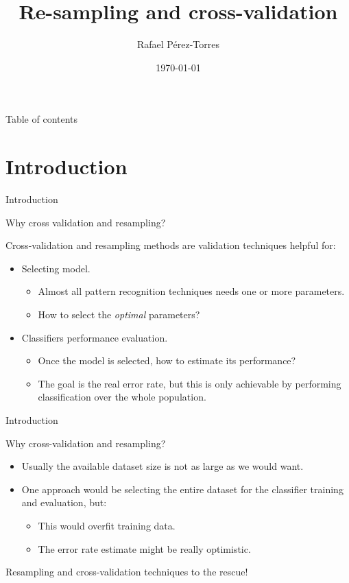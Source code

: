 \documentclass[aspectratio=169,compress,10pt]{beamer}
\author{Rafael Pérez-Torres}
\title{Re-sampling and cross-validation}
\institute{Cinvestav Tamaulipas}
\date{\today}
\begin{document}
\frame{\maketitle}
\begin{frame}{Table of contents}
	\tableofcontents
\end{frame}

\section{Introduction}
\begin{frame}{Introduction}

{\Large{} Why cross validation and resampling?} 

Cross-validation and resampling methods are validation techniques helpful for:
\begin{itemize}
	\item Selecting model.
	\begin{itemize}
		\item Almost all pattern recognition techniques needs one or more parameters.
		\item How to select the \emph{optimal} parameters?
	\end{itemize}
	\item Classifiers performance evaluation.
	\begin{itemize}
		\item Once the model is selected, how to estimate its performance?
		\item The goal is the real error rate, but this is only achievable by performing classification over the whole population.
	\end{itemize}
\end{itemize}
\end{frame}

\begin{frame}{Introduction}

{\Large{} Why cross-validation and resampling?} 

\begin{itemize}
	\item Usually the available dataset size is not as large as we would want.
	\item One approach would be selecting the entire dataset for the classifier training and evaluation, but:
	\begin{itemize}
		\item This would overfit training data.
		\item The error rate estimate might be really optimistic.
	\end{itemize}
\end{itemize}

{\Large{} Resampling and cross-validation techniques to the rescue!} 
\end{frame}
\end{document}
